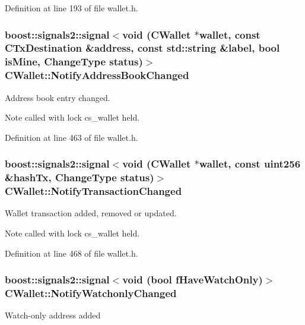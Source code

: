 Definition at line 193 of file wallet.\+h.

\hypertarget{class_c_wallet_a86f4563888686dd3dbdee406f74f8d3f}{}
\subsubsection[{Notify\+Address\+Book\+Changed}]{\setlength{\rightskip}{0pt plus 5cm}boost\+::signals2\+::signal$<$void ({\bf C\+Wallet} $\ast$wallet, const {\bf C\+Tx\+Destination} \&address, const std\+::string \&label, bool is\+Mine, {\bf Change\+Type} status)$>$ C\+Wallet\+::\+Notify\+Address\+Book\+Changed}\label{class_c_wallet_a86f4563888686dd3dbdee406f74f8d3f}
Address book entry changed. \begin{DoxyNote}{Note}
called with lock cs\+\_\+wallet held. 
\end{DoxyNote}


Definition at line 463 of file wallet.\+h.

\hypertarget{class_c_wallet_acd26616ef558afbc5bc62d72603957fc}{}
\subsubsection[{Notify\+Transaction\+Changed}]{\setlength{\rightskip}{0pt plus 5cm}boost\+::signals2\+::signal$<$void ({\bf C\+Wallet} $\ast$wallet, const {\bf uint256} \&hash\+Tx, {\bf Change\+Type} status)$>$ C\+Wallet\+::\+Notify\+Transaction\+Changed}\label{class_c_wallet_acd26616ef558afbc5bc62d72603957fc}
Wallet transaction added, removed or updated. \begin{DoxyNote}{Note}
called with lock cs\+\_\+wallet held. 
\end{DoxyNote}


Definition at line 468 of file wallet.\+h.

\hypertarget{class_c_wallet_a52e8f380ef8d36622381687056d95df8}{}
\subsubsection[{Notify\+Watchonly\+Changed}]{\setlength{\rightskip}{0pt plus 5cm}boost\+::signals2\+::signal$<$void (bool f\+Have\+Watch\+Only)$>$ C\+Wallet\+::\+Notify\+Watchonly\+Changed}\label{class_c_wallet_a52e8f380ef8d36622381687056d95df8}
Watch-\/only address added 

